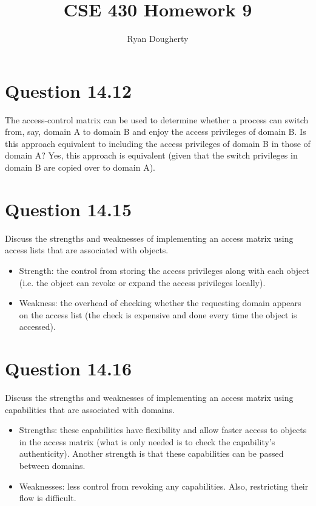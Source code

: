 \documentclass[12pt]{article}
\title{CSE 430 Homework 9}
\author{Ryan Dougherty}
\date{}                                           %
\begin{document}
\maketitle

\section*{Question 14.12} {\color{blue}The access-control matrix can be used to determine whether a process can switch from, say, domain A to domain B and enjoy the access privileges of domain B. Is this approach equivalent to including the access privileges of domain B in those of domain A?
} Yes, this approach is equivalent (given that the switch privileges in domain B are copied over to domain A).

\section*{Question 14.15} {\color{blue}Discuss the strengths and weaknesses of implementing an access matrix using access lists that are associated with objects.
}
\begin{itemize}
\item Strength: the control from storing the access privileges along with each object (i.e. the object can revoke or expand the access privileges locally).
\item Weakness: the overhead of checking whether the requesting domain appears on the access list (the check is expensive and done every time the object is accessed).
\end{itemize}


\section*{Question 14.16} {\color{blue}Discuss the strengths and weaknesses of implementing an access matrix using capabilities that are associated with domains.
} 
\begin{itemize}
\item Strengths: these capabilities have flexibility and allow faster access to objects in the access matrix (what is only needed is to check the capability's authenticity). Another strength is that these capabilities can be passed between domains. 
\item Weaknesses: less control from revoking any capabilities. Also, restricting their flow is difficult.
\end{itemize}
\end{document}
